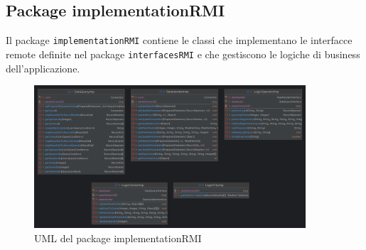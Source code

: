 \subsection{Package implementationRMI}
Il package \texttt{implementationRMI} contiene le classi che implementano le interfacce remote definite nel package \texttt{interfacesRMI} e che gestiscono le logiche di business dell'applicazione.\\

\begin{figure}[H]
      \centering
      \includegraphics[width=0.9\textwidth]{img/implementatioRMIPackage.png}
      \caption{UML del package implementationRMI}
      \label{fig:implementationRMI}  
\end{figure}

